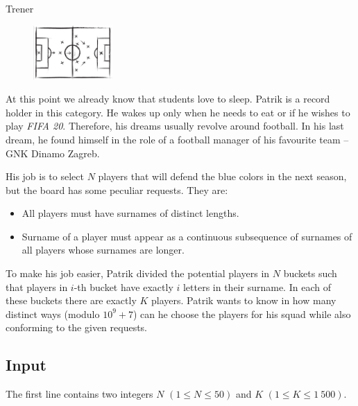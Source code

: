 \begin{statement}[
  problempoints=110,
  timelimit=2 seconds,
  memorylimit=512 MiB,
]{Trener}

\setlength\intextsep{-0.1cm}
\begin{figure}
\centering
\includegraphics[width=0.27\textwidth]{img/trener.png}
\end{figure}

At this point we already know that students love to sleep. Patrik is a record
holder in this category. He wakes up only when he needs to eat or if he
wishes to play \textit{FIFA 20}. Therefore, his dreams usually revolve around
football. In his last dream, he found himself in the role of a football manager
of his favourite team -- GNK Dinamo Zagreb.

His job is to select $N$ players that will defend the blue colors in the next
season, but the board has some peculiar requests. They are:

\begin{itemize}
  \item All players must have surnames of distinct lengths.
  \item Surname of a player must appear as a continuous subsequence of surnames
        of all players whose surnames are longer.
\end{itemize}

To make his job easier, Patrik divided the potential players in $N$ buckets
such that players in $i$-th bucket have exactly $i$ letters in their surname.
In each of these buckets there are exactly $K$ players. Patrik wants to know
in how many distinct ways (modulo $10^9 + 7$) can he choose the players for
his squad while also conforming to the given requests.

\subsection*{Input}
The first line contains two integers $N$ $(1 \le N \le 50)$ and $K$ $(1 \le K \le 1\
500)$.


\end{statement}
